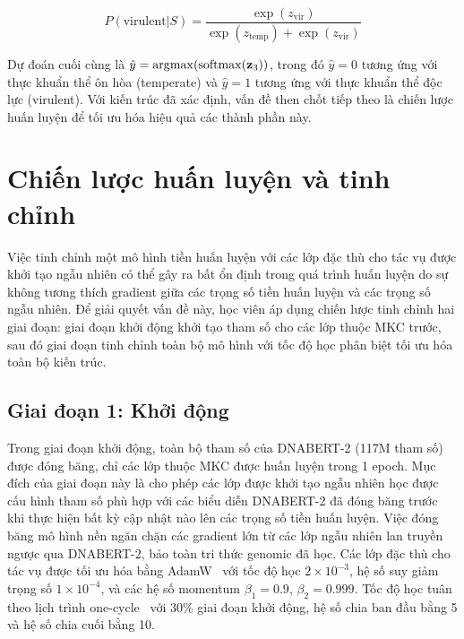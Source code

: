 \begin{equation}
    P(\text{virulent} | S) = \frac{\exp(z_{\text{vir}})}{\exp(z_{\text{temp}}) + \exp(z_{\text{vir}})}
    \label{eq:softmax}
\end{equation}

Dự đoán cuối cùng là $\hat{y} = \arg\!\max(\operatorname{softmax}(\mathbf{z}_3))$, trong đó $\hat{y} = 0$ tương ứng với thực khuẩn thể ôn hòa (temperate) và $\hat{y} = 1$ tương ứng với thực khuẩn thể độc lực (virulent). Với kiến trúc đã xác định, vấn đề then chốt tiếp theo là chiến lược huấn luyện để tối ưu hóa hiệu quả các thành phần này.

\section{Chiến lược huấn luyện và tinh chỉnh}
\label{sec:training_strategy}

Việc tinh chỉnh một mô hình tiền huấn luyện với các lớp đặc thù cho tác vụ được khởi tạo ngẫu nhiên có thể gây ra bất ổn định trong quá trình huấn luyện do sự không tương thích gradient giữa các trọng số tiền huấn luyện và các trọng số ngẫu nhiên. Để giải quyết vấn đề này, học viên áp dụng chiến lược tinh chỉnh hai giai đoạn: giai đoạn khởi động khởi tạo tham số cho các lớp thuộc MKC trước, sau đó giai đoạn tinh chỉnh toàn bộ mô hình với tốc độ học phân biệt tối ưu hóa toàn bộ kiến trúc.

\subsection{Giai đoạn 1: Khởi động}

Trong giai đoạn khởi động, toàn bộ tham số của DNABERT-2 (117M tham số) được đóng băng, chỉ các lớp thuộc MKC được huấn luyện trong 1 epoch. Mục đích của giai đoạn này là cho phép các lớp được khởi tạo ngẫu nhiên học được cấu hình tham số phù hợp với các biểu diễn DNABERT-2 đã đóng băng trước khi thực hiện bất kỳ cập nhật nào lên các trọng số tiền huấn luyện. Việc đóng băng mô hình nền ngăn chặn các gradient lớn từ các lớp ngẫu nhiên lan truyền ngược qua DNABERT-2, bảo toàn tri thức genomic đã học. Các lớp đặc thù cho tác vụ được tối ưu hóa bằng AdamW~\cite{loshchilov2017decoupled} với tốc độ học $2 \times 10^{-3}$, hệ số suy giảm trọng số $1 \times 10^{-4}$, và các hệ số momentum $\beta_1 = 0.9$, $\beta_2 = 0.999$. Tốc độ học tuân theo lịch trình one-cycle~\cite{smith2019super} với 30\% giai đoạn khởi động, hệ số chia ban đầu bằng 5 và hệ số chia cuối bằng 10.


